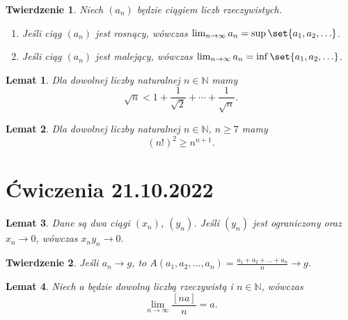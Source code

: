 \documentclass{article}
\newcommand{\N}{\mathbb{N}}
\newcommand{\li}{\lim_{n\to\infty}}
\DeclarePairedDelimiter\set\{\}
\newtheorem{lemma}{Lemat}
\newtheorem{theorem}{Twierdzenie}
\begin{document}
\begin{theorem} %
    Niech $(a_n)$ będzie ciągiem liczb rzeczywistych.
    \begin{enumerate}[label=(\alph*)]
        \item Jeśli ciąg $(a_n)$ jest rosnący, wówczas $\li{a_n}=\sup{\set{a_1,a_2,\ldots}}$.
        \item Jeśli ciąg $(a_n)$ jest malejący, wówczas $\li{a_n}=\inf{\set{a_1,a_2,\ldots}}$.
    \end{enumerate}
\end{theorem}

\begin{lemma} %
    Dla dowolnej liczby naturalnej $n\in\N$ mamy
    \begin{equation*}
        \sqrt{n}<1+\frac{1}{\sqrt{2}}+\cdots+\frac{1}{\sqrt{n}}.
    \end{equation*}
\end{lemma}

\begin{lemma} %
    Dla dowolnej liczby naturalnej $n\in\N$, $n\ge 7$ mamy
    \begin{equation*}
        (n!)^2\ge n^{n+1}.
    \end{equation*}
\end{lemma}

                                            \section{Ćwiczenia 21.10.2022}

\begin{lemma} %
    Dane są dwa ciągi $(x_n)$, $(y_n)$. Jeśli $(y_n)$ jest ograniczony oraz $x_n\to 0$, wówczas
    $x_n y_n \to 0$.
\end{lemma}

\begin{theorem} %
    Jeśli $a_n\to g$, to $A(a_1,a_2,\ldots,a_n)=\frac{a_1+a_2+\ldots+a_n}{n}\to g$.
\end{theorem}    

\begin{lemma} %
    Niech a będzie dowolną liczbą rzeczywistą i $n\in\N$, wówczas
    \begin{equation*}
        \li{\frac{[na]}{n}}=a.
    \end{equation*}
\end{lemma}
\end{document}
